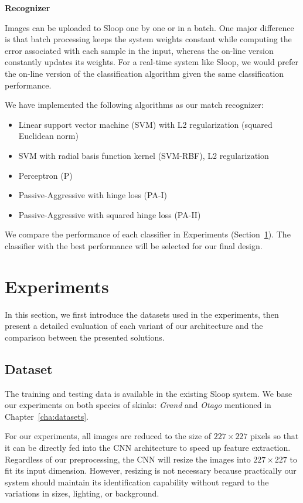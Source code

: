 \textbf{Recognizer}

Images can be uploaded to Sloop one by one or in a batch. One major difference
is that batch processing keeps the system weights constant while computing
the error associated with each sample in the input, whereas the on-line version
constantly updates its weights. For a real-time system like Sloop, we would
prefer the on-line version of the classification algorithm given the same
classification performance.

We have implemented the following algorithms as our match recognizer:
\begin{itemize}
  \item Linear support vector machine (SVM) with L2 regularization (squared
    Euclidean norm)
  \item SVM with radial basis function kernel (SVM-RBF), L2 regularization
  \item Perceptron (P)
  \item Passive-Aggressive with hinge loss (PA-I)
  \item Passive-Aggressive with squared hinge loss (PA-II)
\end{itemize}

We compare the performance of each classifier in Experiments
(Section~\ref{sec:sloopy_experiments}). The classifier with the best performance will
be selected for our final design.

\section{Experiments} %
\label{sec:sloopy_experiments}

In this section, we first introduce the datasets used in the experiments, then
present a detailed evaluation of each variant of our architecture and the
comparison between the presented solutions.

\subsection{Dataset}

The training and testing data is available in the existing Sloop system. We
base our experiments on both species of skinks: \emph{Grand} and \emph{Otago}
mentioned in Chapter~\ref{cha:datasets}.

For our experiments, all images are reduced to the size of
$227 \times 227$ pixels so that it can be directly fed into the CNN
architecture to speed up feature extraction. Regardless of our preprocessing,
the CNN will resize the images into $227 \times 227$ to fit its input
dimension. However, resizing is not necessary because practically our system
should maintain its identification capability without regard to the variations
in sizes, lighting, or background.

